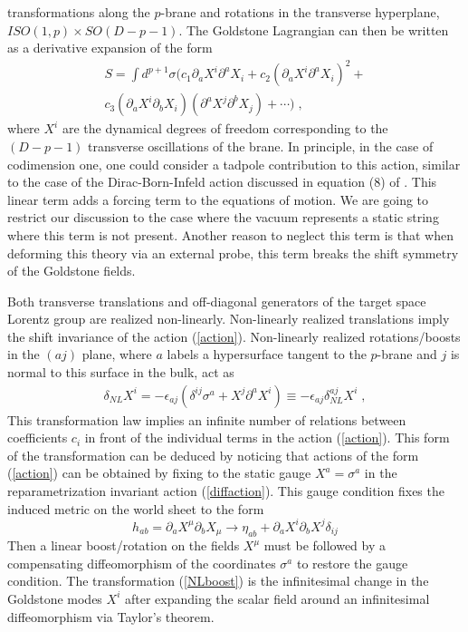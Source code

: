 \documentclass[%
 reprint,
 amsmath,amssymb,
 aps,
]{revtex4-1}
\begin{document}
transformations along the $p$-brane and rotations in the transverse hyperplane,
$ISO(1,p)\times SO(D-p-1)$. The Goldstone Lagrangian can then be written
as a derivative expansion of the form
\begin{eqnarray}
\label{action}
S =  \int d^{p + 1} \sigma (c_1 \partial_a X^i \partial^a X_i +
    c_2 (\partial_a X^i \partial^a X_i)^2 +  \\
    c_3 (\partial_a X^i \partial_b X_i)(\partial^a X^j \partial^b X_j) + \cdots )\; , \nonumber
\end{eqnarray}
where $X^i$ are the dynamical degrees of freedom  corresponding to the $(D-p-1)$ transverse oscillations
of the brane. In principle, in the case of codimension one, one could consider a tadpole contribution to this action, similar to the case of the Dirac-Born-Infeld
action discussed in equation (8) of \cite{deRham:2010eu}.  This linear term adds a forcing term to the equations of motion.  We are going to restrict our discussion
to the case where the vacuum represents a static string where this term is not present. Another reason to neglect this term is that when deforming this theory via an
external probe, this term breaks the shift symmetry of the Goldstone fields.

Both transverse translations and off-diagonal generators of the target space
Lorentz group are realized non-linearly. Non-linearly realized translations imply the shift invariance of the action (\ref{action}).
 Non-linearly realized rotations/boosts in the $(aj)$ plane, where $a$ labels a hypersurface tangent to the $p$-brane and $j$ is normal to
this surface in the bulk, act as
\begin{eqnarray}
\label{NLboost}
\delta_{NL} X^i = - \epsilon_{a j} (\delta^{ij} \sigma^a + X^j \partial^a X^{i}) \equiv -\epsilon_{aj}\delta^{aj}_{NL} X^i \; ,
\end{eqnarray}
This transformation law implies an infinite number of relations between
coefficients $c_i$ in front of the individual terms in the action (\ref{action}). This form of the transformation can be deduced by noticing that actions
of the form (\ref{action}) can be obtained by fixing to the static gauge $X^a=\sigma^a$ in the reparametrization invariant action
(\ref{diffaction}). This gauge condition fixes the induced metric on the world sheet to the form
\begin{equation}
    h_{ab} = \partial_a X^{\mu} \partial_b X_{\mu} \rightarrow \eta_{a b} + \partial_a X^i \partial_b X^j \delta_{i j}
   \nonumber
\end{equation}
Then a linear boost/rotation on the fields $X^{\mu}$ must be followed by a compensating
diffeomorphism of the coordinates $\sigma^a$ to restore the gauge condition.  The transformation (\ref{NLboost}) is the infinitesimal change in the
Goldstone modes $X^i$ after expanding the scalar field around an infinitesimal diffeomorphism via Taylor's theorem.
\end{document}
